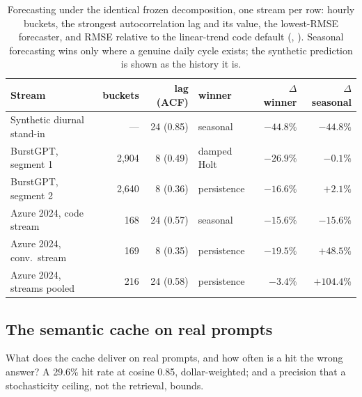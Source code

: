 \begin{table}[htbp]
\centering\tablefontsmall\setlength{\tabcolsep}{4pt}
\begin{tabularx}{\textwidth}{@{}Xrrlrr@{}}
\toprule
\textbf{Stream} & \textbf{buckets} & \textbf{lag (ACF)} & \textbf{winner} & $\Delta$ \textbf{winner} & $\Delta$ \textbf{seasonal} \\
\midrule
Synthetic diurnal stand-in & --- & 24 (0.85) & seasonal & $-44.8\%$ & $-44.8\%$ \\
BurstGPT, segment 1 & 2,904 & 8 (0.49) & damped Holt & $-26.9\%$ & $-0.1\%$ \\
BurstGPT, segment 2 & 2,640 & 8 (0.36) & persistence & $-16.6\%$ & $+2.1\%$ \\
Azure 2024, code stream & 168 & 24 (0.57) & seasonal & $-15.6\%$ & $-15.6\%$ \\
Azure 2024, conv.\ stream & 169 & 8 (0.35) & persistence & $-19.5\%$ & $+48.5\%$ \\
Azure 2024, streams pooled & 216 & 24 (0.58) & persistence & $-3.4\%$ & $+104.4\%$ \\
\bottomrule
\end{tabularx}
\caption{Forecasting under the identical frozen decomposition, one stream
per row: hourly buckets, the strongest autocorrelation lag and its value,
the lowest-RMSE forecaster, and RMSE relative to the linear-trend code
default (, ).
Seasonal forecasting wins only where a genuine daily cycle exists; the
synthetic prediction is shown as the history it is.}
\label{tab:forecast}
\end{table}

\subsection{The semantic cache on real prompts}
\label{sec:eval-cache}

What does the cache deliver on real prompts, and how often is a hit the
wrong answer? A 29.6\% hit rate at cosine 0.85, dollar-weighted; and a
precision that a stochasticity ceiling, not the retrieval, bounds.

